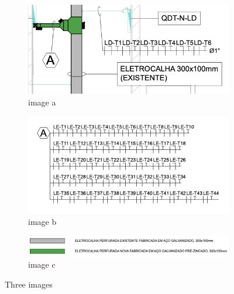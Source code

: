 \begin{figure}[H]
	\centering
	\begin{subfigure}[b]{0.45\textwidth}
		\centering
		\includegraphics[width=\textwidth]{Figures/6. Distribution/avoid1a.png}
		\caption{image a}
		\label{fig: style 1 avoid a}
	\end{subfigure}
	\hfill
	\begin{subfigure}[b]{0.45\textwidth}
		\centering
		\includegraphics[width=\textwidth]{Figures/6. Distribution/avoid1b.png}
		\caption{image b}
		\label{fig: style 1 avoid b}
	\end{subfigure}
	\hfill
	\begin{subfigure}[b]{0.9\textwidth}
		\centering
		\includegraphics[width=\textwidth]{Figures/6. Distribution/avoid1c.png}
		\caption{image c}
		\label{fig: style 1 avoid c}
	\end{subfigure}
	\caption{Three images}
	\label{fig: style 1 avoids}
\end{figure}
